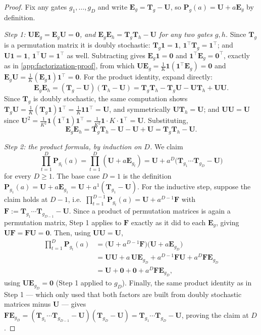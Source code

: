 \begin{proof}
Fix any gates $g_1,\ldots,g_D$ and write $\bm E_g=\bm T_g-\bm U$, so
$\bm P_g(a)=\bm U+a\bm E_g$ by definition.

\emph{Step 1: $\bm U\bm E_g=\bm E_g\bm U=\bm0$, and
$\bm E_g\bm E_h=\bm T_g\bm T_h-\bm U$ for any two gates $g,h$.} Since $\bm T_g$
is a permutation matrix it is doubly stochastic:
$\bm T_g\mathbf1=\mathbf1$, $\mathbf1^\top\bm T_g=\mathbf1^\top$; and
$\bm U\mathbf1=\mathbf1$, $\mathbf1^\top\bm U=\mathbf1^\top$ as well. Subtracting
gives $\bm E_g\mathbf1=\bm0$ and $\mathbf1^\top\bm E_g=\bm0^\top$, exactly as
in \cref{app:factorization-proof}, from which
$\bm U\bm E_g=\tfrac1K\mathbf1(\mathbf1^\top\bm E_g)=\bm0$ and
$\bm E_g\bm U=\tfrac1K(\bm E_g\mathbf1)\mathbf1^\top=\bm0$. For the product
identity, expand directly:
\[
 \bm E_g\bm E_h=(\bm T_g-\bm U)(\bm T_h-\bm U)
 =\bm T_g\bm T_h-\bm T_g\bm U-\bm U\bm T_h+\bm U\bm U.
\]
Since $\bm T_g$ is doubly stochastic, the same computation shows
$\bm T_g\bm U=\tfrac1K(\bm T_g\mathbf1)\mathbf1^\top=\tfrac1K\mathbf1\mathbf1^\top=\bm U$,
and symmetrically $\bm U\bm T_h=\bm U$; and $\bm U\bm U=\bm U$ since
$\bm U^2=\tfrac1{K^2}\mathbf1(\mathbf1^\top\mathbf1)\mathbf1^\top=\tfrac1{K^2}\mathbf1\cdot K\cdot\mathbf1^\top=\bm U$.
Substituting,
\[
 \bm E_g\bm E_h=\bm T_g\bm T_h-\bm U-\bm U+\bm U=\bm T_g\bm T_h-\bm U.
\]

\emph{Step 2: the product formula, by induction on $D$.} We claim
\[
 \prod_{t=1}^D\bm P_{g_t}(a)=\prod_{t=1}^D(\bm U+a\bm E_{g_t})
 =\bm U+a^D\bigl(\bm T_{g_1}\cdots\bm T_{g_D}-\bm U\bigr)
\]
for every $D\ge1$. The base case $D=1$ is the definition
$\bm P_{g_1}(a)=\bm U+a\bm E_{g_1}=\bm U+a^1(\bm T_{g_1}-\bm U)$. For the
inductive step, suppose the claim holds at $D-1$, i.e.\
$\prod_{t=1}^{D-1}\bm P_{g_t}(a)=\bm U+a^{D-1}\bm F$ with
$\bm F:=\bm T_{g_1}\cdots\bm T_{g_{D-1}}-\bm U$. Since a product of
permutation matrices is again a permutation matrix, Step 1 applies to $\bm F$
exactly as it did to each $\bm E_g$, giving $\bm U\bm F=\bm F\bm U=\bm0$.
Then, using $\bm U\bm U=\bm U$,
\begin{align*}
 \prod_{t=1}^D\bm P_{g_t}(a)
 &=\bigl(\bm U+a^{D-1}\bm F\bigr)\bigl(\bm U+a\bm E_{g_D}\bigr)\\
 &=\bm U\bm U+a\,\bm U\bm E_{g_D}+a^{D-1}\bm F\bm U+a^D\bm F\bm E_{g_D}\\
 &=\bm U+\bm0+\bm0+a^D\bm F\bm E_{g_D},
\end{align*}
using $\bm U\bm E_{g_D}=\bm0$ (Step 1 applied to $g_D$). Finally, the same
product identity as in Step 1 --- which only used that both factors are
built from doubly stochastic matrices minus $\bm U$ --- gives
$\bm F\bm E_{g_D}=(\bm T_{g_1}\cdots\bm T_{g_{D-1}}-\bm U)(\bm T_{g_D}-\bm U)=\bm T_{g_1}\cdots\bm T_{g_D}-\bm U$,
proving the claim at $D$.


\end{proof}
